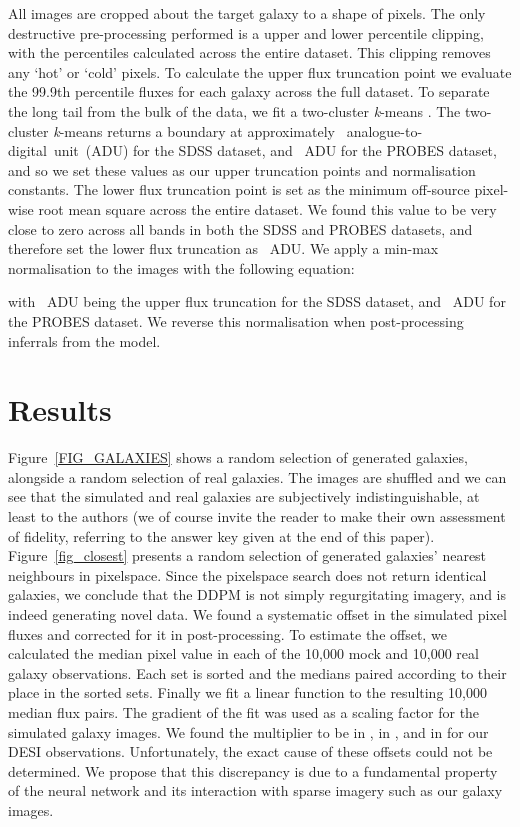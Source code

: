 \documentclass[fleqn,usenatbib]{mnras}
\begin{document}
All images are cropped about the target galaxy to a shape of \mbox{} pixels. The only destructive pre-processing performed is a upper
and lower percentile clipping, with the percentiles calculated across the
entire dataset. This clipping removes any `hot' or `cold' pixels. To calculate
the upper flux truncation point we evaluate the 99.9th percentile fluxes for
each galaxy across the full dataset. To separate the long tail from
the bulk of the data, we fit a two-cluster {\it k}-means \citep{cite_lloyd1982}.
The two-cluster {\it k}-means returns a boundary at approximately
~analogue-to-digital~unit~(ADU) for the SDSS dataset, and ~ADU for the
PROBES dataset, and so we set these values as our upper truncation points and
normalisation constants. The lower flux truncation point is set as the minimum
off-source pixel-wise root mean square across the entire dataset. We found this
value to be very close to zero across all bands in both the SDSS and PROBES
datasets, and therefore set the lower flux truncation as ~ADU. We apply a
min-max normalisation to the images with the following equation:

with ~ADU being the upper flux truncation for the SDSS dataset, and ~ADU for the PROBES dataset. We reverse this normalisation when post-processing
inferrals from the model.

\section{Results} \label{sec_results}

Figure~\ref{FIG_GALAXIES} shows a random selection of generated galaxies,
alongside a random selection of real galaxies. The images are shuffled and we
can see that the simulated and real galaxies are subjectively
indistinguishable, at least to the authors (we of course invite the reader to
make their own assessment of fidelity, referring to the answer key given at the
end of this paper). Figure~\ref{fig_closest} presents a random selection of
generated galaxies' nearest neighbours in pixelspace. Since the pixelspace
search does not return identical galaxies, we conclude that the DDPM is not
simply regurgitating imagery, and is indeed generating novel data.  We found a
systematic offset in the simulated pixel fluxes and corrected for it in
post-processing.  To estimate the offset, we calculated the median pixel value
in each of the 10,000 mock and 10,000 real galaxy observations. Each set is
sorted and the medians paired according to their place in the sorted sets.
Finally we fit a linear function to the resulting 10,000 median flux pairs. The
gradient of the fit was used as a scaling factor for the simulated galaxy
images.  We found the multiplier to be  in ,  in , and 
in  for our DESI observations.  Unfortunately, the exact cause of these
offsets could not be determined.  We propose that this discrepancy is due to a
fundamental property of the neural network and its interaction with sparse
imagery such as our galaxy images.
\end{document}
